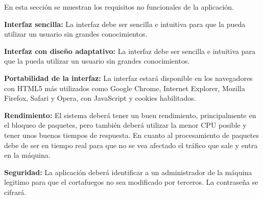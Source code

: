 En esta sección se muestran los requisitos no funcionales de la aplicación.
\begin{nonfunctional}
        
        \item \textbf{Interfaz sencilla:} La interfaz debe ser sencilla e intuitiva para que la pueda utilizar un usuario sin grandes conocimientos.
        \item \textbf{Interfaz con diseño adaptativo:} La interfaz debe ser sencilla e intuitiva para que la pueda utilizar un usuario sin grandes conocimientos.
        \item \textbf{Portabilidad de la interfaz:} La interfaz estará disponible en los navegadores con HTML5 más utilizados como Google Chrome, Internet Explorer, Mozilla Firefox, Safari y Opera, con JavaScript y cookies habilitados.
        \item \textbf{Rendimiento:} El sistema deberá tener un buen rendimiento, principalmente en el bloqueo de paquetes, pero también deberá utilizar la menor CPU posible y tener unos buenos tiempos de respuesta. En cuanto al procesamiento de paquetes debe de ser en tiempo real para que no se vea afectado el tráfico que sale y entra en la máquina.
        \item \textbf{Seguridad:} La aplicación deberá identificar a un administrador de la máquina legitimo para que el cortafuegos no sea modificado por terceros. La contraseña se cifrará.
        
        
\end{nonfunctional}


